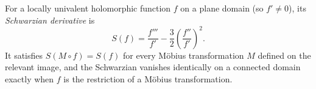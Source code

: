 
For a locally univalent holomorphic function $f$ on a plane domain (so $f'\ne0$), its \emph{Schwarzian derivative} is
\[
S(f)=\frac{f'''}{f'}-\frac32\left(\frac{f''}{f'}\right)^2.
\]
It satisfies $S(M\circ f)=S(f)$ for every Möbius transformation $M$ defined on the relevant image, and the Schwarzian vanishes identically on a connected domain exactly when $f$ is the restriction of a Möbius transformation.
